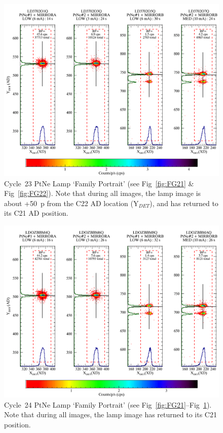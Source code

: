 \begin{center}
\begin{figure}[htb]
\noindent\includegraphics*[width=0.7\linewidth]{png/C23_14440_FP.png}
\caption[C23 WCA Lamp `Family Portrait']{Cycle~23 PtNe Lamp `Family Portrait' (see Fig~\ref{fig:FG21} \& Fig~\ref{fig:FG22}).
	Note that during all images, the lamp image is about +50~p from the C22 AD location (Y$_{DET}$),
	and has returned to its C21 AD position.\label{fig:FG23}}
\end{figure}
\end{center}
\begin{center}
	\begin{figure}[htb]
	\noindent\includegraphics*[width=0.7\linewidth]{png/C24_14857_FP.png}
	\caption[C24 WCA Lamp `Family Portrait']{Cycle~24 PtNe Lamp `Family Portrait' (see Fig~\ref{fig:FG21}--Fig~\ref{fig:FG23}).
	Note that during all images, the lamp image has returned to its C21 position.\label{fig:FG24}}
	\end{figure}
\end{center}
